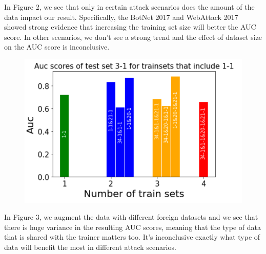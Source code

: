 In Figure 2, we see that only in certain attack scenarios does the amount of the data impact our result. Specifically, the BotNet 2017 and WebAttack 2017 showed strong evidence that increasing the training set size will better the AUC score. In other scenarios, we don't see a strong trend and the effect of dataset size on the AUC score is inconclusive.

\begin{figure}[H]
    \centering
    \includegraphics[width=1\linewidth]{data.png}
    \caption{}
\end{figure}

In Figure 3, we augment the data with different foreign datasets and we see that there is huge variance in the resulting AUC scores, meaning that the type of data that is shared with the trainer matters too. It's inconclusive exactly what type of data will benefit the most in different attack scenarios.

\label{sec:results}
